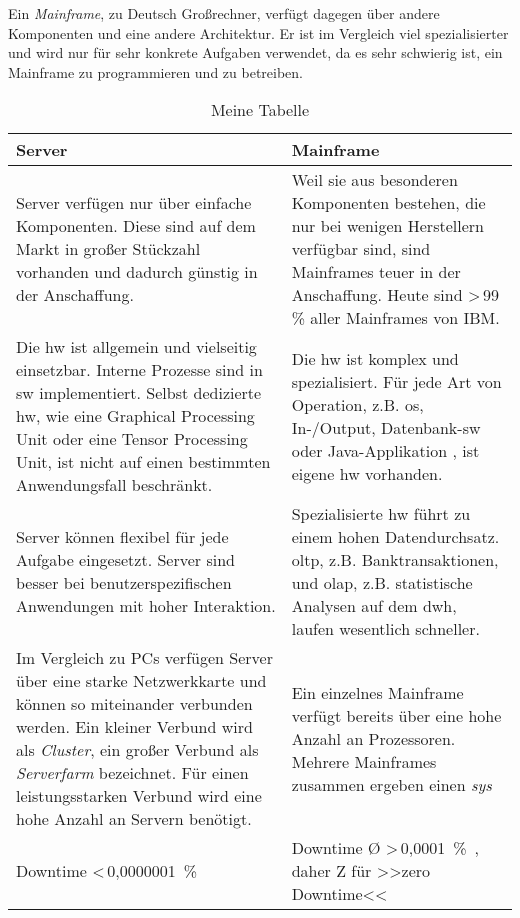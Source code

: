 Ein \emph{Mainframe}, zu Deutsch Großrechner, verfügt dagegen über andere Komponenten und eine andere Architektur. Er ist im Vergleich viel spezialisierter und wird nur für sehr konkrete Aufgaben verwendet, da es sehr schwierig ist, ein Mainframe zu programmieren und zu betreiben.
\begin{table}[H]
    \centering
    \begin{tabularx}{\textwidth}{|X|X|}
        \hline
        \textbf{Server} & \textbf{Mainframe} \\
        \hline
        Server verfügen nur über einfache Komponenten. Diese sind auf dem Markt in großer Stückzahl vorhanden und dadurch günstig in der Anschaffung.
        &
        Weil sie aus besonderen Komponenten bestehen, die nur bei wenigen Herstellern verfügbar sind, sind Mainframes teuer in der Anschaffung. Heute sind >\,99 \% aller Mainframes von IBM.
        \\
        \hline
        Die \ac{hw} ist allgemein und vielseitig einsetzbar. Interne Prozesse sind in \ac{sw} implementiert. Selbst dedizierte \ac{hw}, wie eine Graphical Processing Unit oder eine Tensor Processing Unit, ist nicht auf einen bestimmten Anwendungsfall beschränkt.
        &
        Die \ac{hw} ist komplex und spezialisiert. Für jede Art von Operation, z.B. \ac{os}, In-/Output, Datenbank-\ac{sw} oder Java-Applikation \cite{redbook.1}, ist eigene \ac{hw} vorhanden.
        \\
        \hline
        Server können flexibel für jede Aufgabe eingesetzt. Server sind besser bei benutzerspezifischen Anwendungen mit hoher Interaktion.
        &
        Spezialisierte \ac{hw} führt zu einem hohen Datendurchsatz. \ac{oltp}, z.B. Banktransaktionen, und \ac{olap}, z.B. statistische Analysen auf dem \ac{dwh}, laufen wesentlich schneller.
        \\
        \hline
        Im Vergleich zu PCs verfügen Server über eine starke Netzwerkkarte und können so miteinander verbunden werden. Ein kleiner Verbund wird als \emph{Cluster}, ein großer Verbund als \emph{Serverfarm} bezeichnet. Für einen leistungsstarken Verbund wird eine hohe Anzahl an Servern benötigt.
        &
        Ein einzelnes Mainframe verfügt bereits über eine hohe Anzahl an Prozessoren. Mehrere Mainframes zusammen ergeben einen \emph{\acs{sys}}
        \\
        \hline
        Downtime <\,0,0000001~\%
        &
        Downtime Ø >\,0,0001~\%~\cite{itic}, daher \frq{}Z\flq{} für >>zero Downtime<<
        \\
        \hline
    \end{tabularx}
    \caption{Meine Tabelle}
\end{table}


